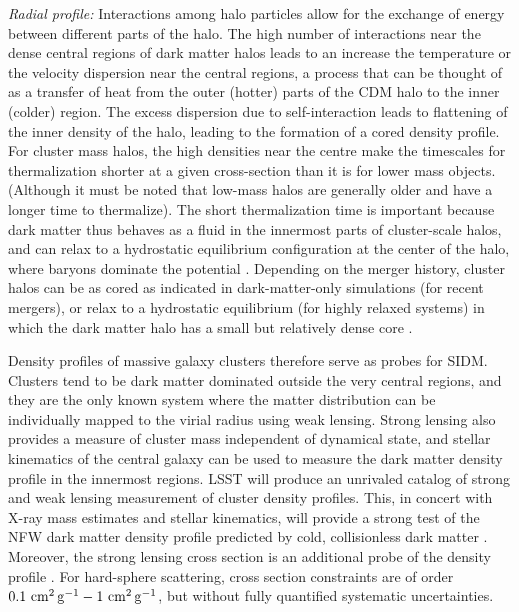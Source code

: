 \emph{Radial profile: }Interactions among halo particles allow for the exchange of energy between different parts of the halo. The high number of interactions near the dense central regions of dark matter halos leads to an increase the temperature or the velocity dispersion near the central regions, a process that can be thought of as a transfer of heat from the outer (hotter) parts of the CDM halo to the inner (colder) region. The excess dispersion due to self-interaction leads to flattening of the inner density of the halo, leading to the formation of a cored density profile. For cluster mass halos, the high densities near the centre make the timescales for thermalization shorter at a given cross-section than it is for lower mass objects. (Although it must be noted that low-mass halos are generally older and have a longer time to thermalize).  The short thermalization time is important because dark matter thus behaves as a fluid in the innermost parts of cluster-scale halos, and can relax to a hydrostatic equilibrium configuration at the center of the halo, where baryons dominate the potential \citep{Kaplinghat:2015aga}.  Depending on the merger history, cluster halos can be as cored as indicated in dark-matter-only simulations (for recent mergers), or relax to a hydrostatic equilibrium (for highly relaxed systems) in which the dark matter halo has a small but relatively dense core \citep{Robertson:2017mgj}.

Density profiles of massive galaxy clusters therefore serve as probes for SIDM. Clusters tend to be dark matter dominated outside the very central regions, and they are the only known system where the matter distribution can be individually mapped to the virial radius using weak lensing. Strong lensing also provides a measure of cluster mass independent of dynamical state, and stellar kinematics of the central galaxy can be used to measure the dark matter density profile in the innermost regions. LSST will produce an unrivaled catalog of strong and weak lensing measurement of cluster density profiles. This, in concert with X-ray mass estimates and stellar kinematics, will provide a strong test of the NFW dark matter density profile predicted by cold, collisionless dark matter \citep{Newman:2013,Kaplinghat:2015aga,Robertson:2018anx,Andrade:2019wzn}. Moreover, the strong lensing cross section is an additional probe of the density profile \citep{Robertson:2018anx}.  For hard-sphere scattering, cross section constraints are of order $0.1\mathrm{\,\mathrm{\,cm}^2\mathrm{\,g}^{-1}}-1\mathrm{\,\mathrm{\,cm}^2\mathrm{\,g}^{-1}}$, but without fully quantified systematic uncertainties.

